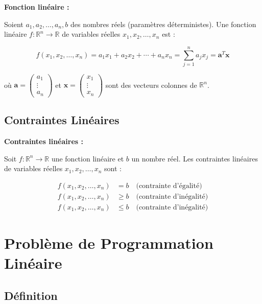 \documentclass[12pt,a4paper]{article}
\begin{document}
\begin{definition}
\textbf{Fonction linéaire :}

Soient $a_1, a_2, \ldots, a_n, b$ des nombres réels (paramètres déterministes). Une fonction linéaire $f : \mathbb{R}^n \to \mathbb{R}$ de variables réelles $x_1, x_2, \ldots, x_n$ est :

$$f(x_1, x_2, \ldots, x_n) = a_1x_1 + a_2x_2 + \cdots + a_nx_n = \sum_{j=1}^{n} a_jx_j = \mathbf{a}^T\mathbf{x}$$

où $\mathbf{a} = \begin{pmatrix} a_1 \\ \vdots \\ a_n \end{pmatrix}$ et $\mathbf{x} = \begin{pmatrix} x_1 \\ \vdots \\ x_n \end{pmatrix}$ sont des vecteurs colonnes de $\mathbb{R}^n$.
\end{definition}

\subsection{Contraintes Linéaires}

\begin{definition}
\textbf{Contraintes linéaires :}

Soit $f : \mathbb{R}^n \to \mathbb{R}$ une fonction linéaire et $b$ un nombre réel. Les contraintes linéaires de variables réelles $x_1, x_2, \ldots, x_n$ sont :

\begin{align*}
f(x_1, x_2, \ldots, x_n) &= b \quad \text{(contrainte d'égalité)}\\
f(x_1, x_2, \ldots, x_n) &\geq b \quad \text{(contrainte d'inégalité)}\\
f(x_1, x_2, \ldots, x_n) &\leq b \quad \text{(contrainte d'inégalité)}
\end{align*}
\end{definition}

\newpage
\section{Problème de Programmation Linéaire}

\subsection{Définition}
\end{document}
